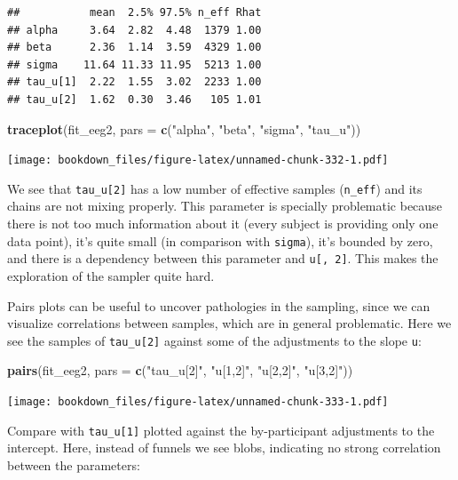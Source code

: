 \documentclass[12pt,]{krantz}
\newenvironment{Shaded}{\begin{snugshade}}{\end{snugshade}}
\newcommand{\DataTypeTok}[1]{\textcolor[rgb]{0.13,0.29,0.53}{#1}}
\newcommand{\KeywordTok}[1]{\textcolor[rgb]{0.13,0.29,0.53}{\textbf{#1}}}
\newcommand{\NormalTok}[1]{#1}
\newcommand{\StringTok}[1]{\textcolor[rgb]{0.31,0.60,0.02}{#1}}
\theoremstyle{definition}
\theoremstyle{definition}
\theoremstyle{definition}
\theoremstyle{remark}
\begin{document}
\begin{verbatim}
##           mean  2.5% 97.5% n_eff Rhat
## alpha     3.64  2.82  4.48  1379 1.00
## beta      2.36  1.14  3.59  4329 1.00
## sigma    11.64 11.33 11.95  5213 1.00
## tau_u[1]  2.22  1.55  3.02  2233 1.00
## tau_u[2]  1.62  0.30  3.46   105 1.01
\end{verbatim}

\begin{Shaded}
\begin{Highlighting}[]
\KeywordTok{traceplot}\NormalTok{(fit_eeg2, }\DataTypeTok{pars =} \KeywordTok{c}\NormalTok{(}\StringTok{"alpha"}\NormalTok{, }\StringTok{"beta"}\NormalTok{, }\StringTok{"sigma"}\NormalTok{, }\StringTok{"tau_u"}\NormalTok{))}
\end{Highlighting}
\end{Shaded}

\texttt{[image: bookdown\_files/figure-latex/unnamed-chunk-332-1.pdf]}

We see that \texttt{tau\_u{[}2{]}} has a low number of effective samples (\texttt{n\_eff}) and its chains are not mixing properly. This parameter is specially problematic because there is not too much information about it (every subject is providing only one data point), it's quite small (in comparison with \texttt{sigma}), it's bounded by zero, and there is a dependency between this parameter and \texttt{u{[},\ 2{]}}. This makes the exploration of the sampler quite hard.

Pairs plots can be useful to uncover pathologies in the sampling, since we can visualize correlations between samples, which are in general problematic. Here we see the samples of \texttt{tau\_u{[}2{]}} against some of the adjustments to the slope \texttt{u}:

\begin{Shaded}
\begin{Highlighting}[]
\KeywordTok{pairs}\NormalTok{(fit_eeg2, }\DataTypeTok{pars =} \KeywordTok{c}\NormalTok{(}\StringTok{"tau_u[2]"}\NormalTok{, }\StringTok{"u[1,2]"}\NormalTok{, }\StringTok{"u[2,2]"}\NormalTok{, }\StringTok{"u[3,2]"}\NormalTok{))}
\end{Highlighting}
\end{Shaded}

\texttt{[image: bookdown\_files/figure-latex/unnamed-chunk-333-1.pdf]}

Compare with \texttt{tau\_u{[}1{]}} plotted against the by-participant adjustments to the intercept. Here, instead of funnels we see blobs, indicating no strong correlation between the parameters:
\end{document}

